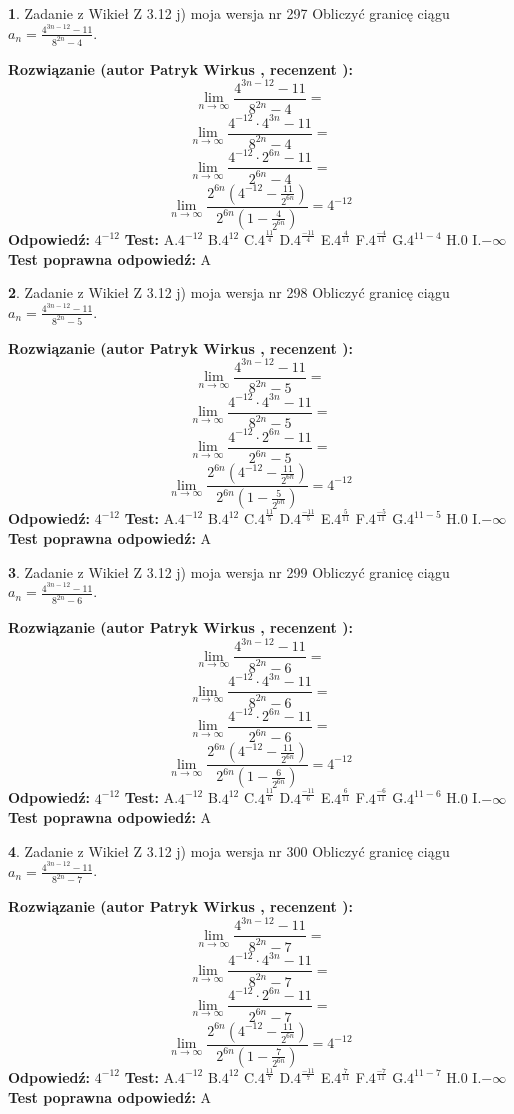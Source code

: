 \documentclass[12pt, a4paper]{article}
\theoremstyle{definition} %
\newtheorem{zad}{}
\newcommand{\zadStart}[1]{\begin{zad}#1\newline}
\newcommand{\zadStop}{\end{zad}}
\newcommand{\rozwStart}[2]{\noindent \textbf{Rozwiązanie (autor #1 , recenzent #2): }\newline}
\newcommand{\rozwStop}{\newline}
\newcommand{\odpStart}{\noindent \textbf{Odpowiedź:}\newline}
\newcommand{\odpStop}{\newline}
\newcommand{\testStart}{\noindent \textbf{Test:}\newline}
\newcommand{\testStop}{\newline}
\newcommand{\kluczStart}{\noindent \textbf{Test poprawna odpowiedź:}\newline}
\newcommand{\kluczStop}{\newline}
\begin{document}
\zadStart{Zadanie z Wikieł Z 3.12 j) moja wersja nr 297}
Obliczyć granicę ciągu $a_{n}=\frac{4^{3n-12}-11}{8^{2n}-4}$.
\zadStop
\rozwStart{Patryk Wirkus}{}
$$\lim\limits_{n\to\infty}\frac{4^{3n-12}-11}{8^{2n}-4}=$$
$$\lim\limits_{n\to\infty}\frac{4^{-12} \cdot 4^{3n}-11}{8^{2n}-4}=$$
$$\lim\limits_{n\to\infty}\frac{4^{-12} \cdot 2^{6n}-11}{2^{6n}-4}=$$
$$\lim\limits_{n\to\infty}\frac{2^{6n}(4^{-12} - \frac{11}{2^{6n}})}{2^{6n}(1-\frac{4}{2^{6n}})}= 4^{-12}$$
\rozwStop
\odpStart
$4^{-12}$
\odpStop
\testStart
A.$4^{-12}$
B.$4^{12}$
C.$4^{\frac{11}{4}}$
D.$4^{\frac{-11}{4}}$
E.$4^{\frac{4}{11}}$
F.$4^{\frac{-4}{11}}$
G.$4^{11-4}$
H.$0$
I.$-\infty$
\testStop
\kluczStart
A
\kluczStop



\zadStart{Zadanie z Wikieł Z 3.12 j) moja wersja nr 298}
Obliczyć granicę ciągu $a_{n}=\frac{4^{3n-12}-11}{8^{2n}-5}$.
\zadStop
\rozwStart{Patryk Wirkus}{}
$$\lim\limits_{n\to\infty}\frac{4^{3n-12}-11}{8^{2n}-5}=$$
$$\lim\limits_{n\to\infty}\frac{4^{-12} \cdot 4^{3n}-11}{8^{2n}-5}=$$
$$\lim\limits_{n\to\infty}\frac{4^{-12} \cdot 2^{6n}-11}{2^{6n}-5}=$$
$$\lim\limits_{n\to\infty}\frac{2^{6n}(4^{-12} - \frac{11}{2^{6n}})}{2^{6n}(1-\frac{5}{2^{6n}})}= 4^{-12}$$
\rozwStop
\odpStart
$4^{-12}$
\odpStop
\testStart
A.$4^{-12}$
B.$4^{12}$
C.$4^{\frac{11}{5}}$
D.$4^{\frac{-11}{5}}$
E.$4^{\frac{5}{11}}$
F.$4^{\frac{-5}{11}}$
G.$4^{11-5}$
H.$0$
I.$-\infty$
\testStop
\kluczStart
A
\kluczStop



\zadStart{Zadanie z Wikieł Z 3.12 j) moja wersja nr 299}
Obliczyć granicę ciągu $a_{n}=\frac{4^{3n-12}-11}{8^{2n}-6}$.
\zadStop
\rozwStart{Patryk Wirkus}{}
$$\lim\limits_{n\to\infty}\frac{4^{3n-12}-11}{8^{2n}-6}=$$
$$\lim\limits_{n\to\infty}\frac{4^{-12} \cdot 4^{3n}-11}{8^{2n}-6}=$$
$$\lim\limits_{n\to\infty}\frac{4^{-12} \cdot 2^{6n}-11}{2^{6n}-6}=$$
$$\lim\limits_{n\to\infty}\frac{2^{6n}(4^{-12} - \frac{11}{2^{6n}})}{2^{6n}(1-\frac{6}{2^{6n}})}= 4^{-12}$$
\rozwStop
\odpStart
$4^{-12}$
\odpStop
\testStart
A.$4^{-12}$
B.$4^{12}$
C.$4^{\frac{11}{6}}$
D.$4^{\frac{-11}{6}}$
E.$4^{\frac{6}{11}}$
F.$4^{\frac{-6}{11}}$
G.$4^{11-6}$
H.$0$
I.$-\infty$
\testStop
\kluczStart
A
\kluczStop



\zadStart{Zadanie z Wikieł Z 3.12 j) moja wersja nr 300}
Obliczyć granicę ciągu $a_{n}=\frac{4^{3n-12}-11}{8^{2n}-7}$.
\zadStop
\rozwStart{Patryk Wirkus}{}
$$\lim\limits_{n\to\infty}\frac{4^{3n-12}-11}{8^{2n}-7}=$$
$$\lim\limits_{n\to\infty}\frac{4^{-12} \cdot 4^{3n}-11}{8^{2n}-7}=$$
$$\lim\limits_{n\to\infty}\frac{4^{-12} \cdot 2^{6n}-11}{2^{6n}-7}=$$
$$\lim\limits_{n\to\infty}\frac{2^{6n}(4^{-12} - \frac{11}{2^{6n}})}{2^{6n}(1-\frac{7}{2^{6n}})}= 4^{-12}$$
\rozwStop
\odpStart
$4^{-12}$
\odpStop
\testStart
A.$4^{-12}$
B.$4^{12}$
C.$4^{\frac{11}{7}}$
D.$4^{\frac{-11}{7}}$
E.$4^{\frac{7}{11}}$
F.$4^{\frac{-7}{11}}$
G.$4^{11-7}$
H.$0$
I.$-\infty$
\testStop
\kluczStart
A
\kluczStop
\end{document}
